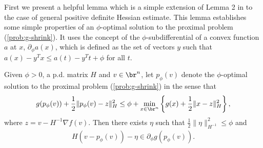 \documentclass[11pt]{article}
\numberwithin{equation}{section}
\begin{document}
First we present a helpful lemma which is a simple extension of Lemma 2 in \cite{Schmidtetal} to the case of general positive definite Hessian estimate. This lemma establishes some simple properties of an $\phi$-optimal solution to the proximal problem (\ref{prob:g-shrink}).  It uses the concept of the $\phi$-subdifferential of a convex function $a$ at $x$, 
$\partial_{\phi} a(x)$, which is defined as the set of vectors $y$ such that $a(x) - y^Tx \leq a(t) - y^Tt + \phi$ for all $t$. 
\begin{lemma}
    \label{lem:inexact_1st_opt_cond}
    Given $\phi >0$, a p.d. matrix $H$ and $v\in \br^n$, let $p_{\phi}(v)$ denote the $\phi$-optimal solution to the proximal problem (\ref{prob:g-shrink}) in the sense that
    \begin{align}
        \label{equ:eps_minimizer}
        g(p_{\phi}(v))+\frac{1}{2}\|p_{\phi}(v)-z\|_H^2 \leq \phi +
        \min_{x\in\br^n}\left\{g(x)+\frac{1}{2}\|x-z\|_H^2 \right\},
    \end{align}
    where $z = v - H^{-1} \nabla f(v)$. Then there exists $\eta$ such that $\frac{1}{2} \| \eta \|^2_{H^{-1}} \leq \phi$ and
    \begin{align}
        \label{equ:inexact_solvQ_lem}
        H(v-p_{\phi}(v))  - \eta \in \partial_{\phi}g(p_{\phi}(v)).
    \end{align}
\end{lemma}
\end{document}
